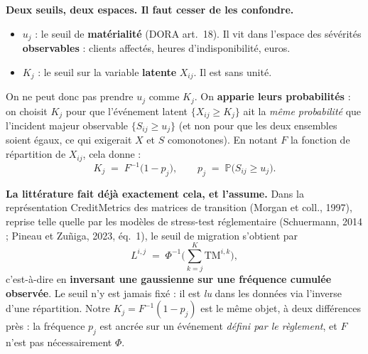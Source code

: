 \documentclass[11pt,a4paper]{article}
\begin{document}
\begin{cle}
\textbf{Deux seuils, deux espaces. Il faut cesser de les confondre.}
\begin{itemize}[leftmargin=1.4em,itemsep=2pt,topsep=2pt]
\item $u_j$ : le seuil de \textbf{matérialité} (DORA art.~18). Il vit dans l'espace des
  sévérités \textbf{observables} : clients affectés, heures d'indisponibilité, euros.
\item $K_j$ : le seuil sur la variable \textbf{latente} $X_{ij}$. Il est sans unité.
\end{itemize}
On ne peut donc pas \og{}prendre $u_j$ comme $K_j$\fg{}. On \textbf{apparie leurs probabilités} :
on choisit $K_j$ pour que l'événement latent $\{X_{ij}\ge K_j\}$ ait la \emph{même probabilité}
que l'incident majeur observable $\{S_{ij}\ge u_j\}$ (et non pour que les deux ensembles soient
égaux, ce qui exigerait $X$ et $S$ comonotones). En notant $F$ la fonction de répartition de
$X_{ij}$, cela donne :
\begin{equation}
\label{eq:Kj}
\boxed{\;K_j \;=\; F^{-1}\!\big(1 - p_j\big), \qquad p_j \;=\; \mathbb P\big(S_{ij} \ge u_j\big).\;}
\end{equation}
\end{cle}

\begin{cle}
\textbf{La littérature fait déjà exactement cela, et l'assume.} Dans la représentation
CreditMetrics des matrices de transition (Morgan et coll., 1997), reprise telle quelle par
les modèles de stress-test réglementaire (Schuermann, 2014 ; Pineau et Zu\~niga, 2023,
éq.~1), le seuil de migration s'obtient par
\[
L^{i,j} \;=\; \Phi^{-1}\!\Big(\textstyle\sum_{k=j}^{K} \mathrm{TM}^{i,k}\Big),
\]
c'est-à-dire en \textbf{inversant une gaussienne sur une fréquence cumulée observée}.
Le seuil n'y est jamais \og{}fixé\fg{} : il est \emph{lu} dans les données via l'inverse
d'une répartition. Notre $K_j = F^{-1}(1-p_j)$ est le même objet, à deux différences près :
la fréquence $p_j$ est ancrée sur un événement \emph{défini par le règlement}, et $F$ n'est
pas nécessairement $\Phi$.
\end{cle}
\end{document}
